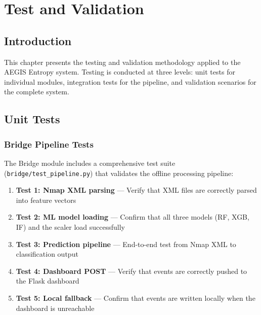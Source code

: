 
\chapter{Test and Validation}

\section{Introduction}

This chapter presents the testing and validation methodology applied to the AEGIS Entropy system. Testing is conducted at three levels: unit tests for individual modules, integration tests for the pipeline, and validation scenarios for the complete system.

\section{Unit Tests}

\subsection{Bridge Pipeline Tests}

The Bridge module includes a comprehensive test suite (\texttt{bridge/test\_pipeline.py}) that validates the offline processing pipeline:

\begin{enumerate}
    \item \textbf{Test 1: Nmap XML parsing} --- Verify that XML files are correctly parsed into feature vectors
    \item \textbf{Test 2: ML model loading} --- Confirm that all three models (RF, XGB, IF) and the scaler load successfully
    \item \textbf{Test 3: Prediction pipeline} --- End-to-end test from Nmap XML to classification output
    \item \textbf{Test 4: Dashboard POST} --- Verify that events are correctly pushed to the Flask dashboard
    \item \textbf{Test 5: Local fallback} --- Confirm that events are written locally when the dashboard is unreachable
\end{enumerate}

